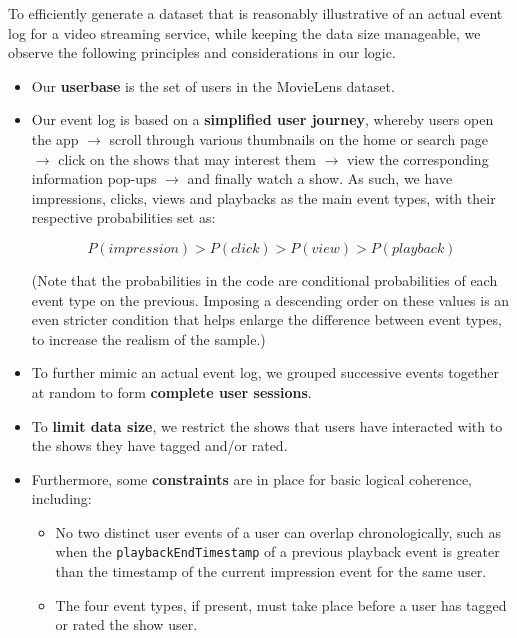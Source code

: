\documentclass[10pt,titlepage]{article}
\begin{document}
\begin{itemize}
        To efficiently generate a dataset that is reasonably illustrative of an actual event log for a video streaming
        service, while keeping the data size manageable, we observe the following principles and considerations in our
        logic.

        \begin{itemize}
            \item Our \textbf{userbase} is the set of users in the MovieLens dataset.

            \item Our event log is based on a \textbf{simplified user journey}, whereby users open the app $\rightarrow$
                scroll through various thumbnails on the home or search page $\rightarrow$ click on the shows that may
                interest them $\rightarrow$ view the corresponding information pop-ups $\rightarrow$ and finally watch a
                show. As such, we have impressions, clicks, views and playbacks as the main event types, with their
                respective probabilities set as:

                $$P(impression) > P(click) > P(view) > P(playback)$$

                (Note that the probabilities in the code are conditional probabilities of each event type on the
                previous. Imposing a descending order on these values is an even stricter condition that helps enlarge
                the difference between event types, to increase the realism of the sample.)
            \item To further mimic an actual event log, we grouped successive events together at random to form 
                \textbf{complete user sessions}.

            \item To \textbf{limit data size}, we restrict the shows that users have interacted with to the shows they have
                tagged and/or rated.

            \item Furthermore, some \textbf{constraints} are in place for basic logical coherence, including:

                \begin{itemize}
                    \item No two distinct user events of a user can overlap chronologically, such as when the
                        \texttt{playbackEndTimestamp} of a previous playback event is greater than the timestamp of the
                        current impression event for the same user.
                    \item The four event types, if present, must take place before a user has tagged or rated the show
                        user.
                \end{itemize}
        \end{itemize}

\end{itemize}
\end{document}
